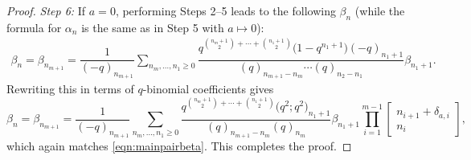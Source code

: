\begin{proof}
	{\it Step 6\emph{:}}
	If $a=0$, performing Steps 2--5 leads to the following $\beta_n$ (while the formula for $\alpha_n$ is the same as in Step 5 with $a\mapsto 0$):
	\begin{align*}
		\beta_n=\beta_{n_{m+1}}=
		\dfrac{1}{(-q)_{n_{m+1}}}\sum_{n_m,\dots,n_1\geq 0}
		\dfrac{q^{\binom{n_{m}+1}{2}+\cdots+\binom{n_1+1}{2}}\bigl(1-q^{n_{1}+1}\bigr)(-q)_{n_1+1}}
		{(q)_{n_{m+1}-n_{m}}\cdots (q)_{n_2-n_1}}
		\beta_{n_1+1}.
	\end{align*}
	Rewriting this in terms of $q$-binomial coefficients gives
	\begin{equation*} %
		\beta_n = \beta_{n_{m+1}} = \frac{1}{(-q)_{n_{m+1}}} \sum_{n_m, \dots, n_1 \geq 0} \frac{q^{\binom{n_m+1}{2} + \cdots + \binom{n_1+1}{2}}\bigl(q^2;q^2\bigr)_{n_1+1}}{(q)_{n_{m+1}-n_m} (q)_{n_m}} \beta_{n_1+1} \prod_{i=1}^{m-1} \begin{bmatrix} n_{i+1} + \delta_{a,i} \\ n_i \end{bmatrix},
	\end{equation*}
	which again matches \eqref{eqn:mainpairbeta}. This completes the proof.
\end{proof}

